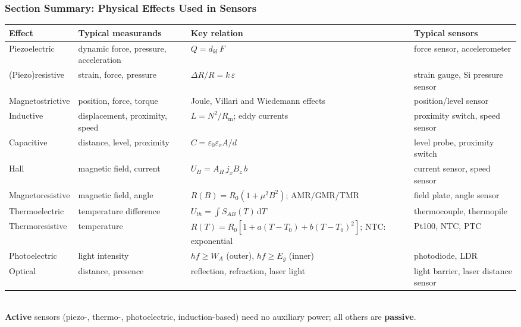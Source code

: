 \begin{frame}
	\frametitle{Section Summary: Physical Effects Used in Sensors}
	\scriptsize
	\setlength{\tabcolsep}{3pt}
	\begin{tabular}{@{}L{0.14\textwidth}L{0.22\textwidth}L{0.33\textwidth}L{0.27\textwidth}@{}}
		\toprule
		\textbf{Effect} & \textbf{Typical measurands} & \textbf{Key relation} & \textbf{Typical sensors}\\
		\midrule
		Piezoelectric & dynamic force, pressure, acceleration & $Q = d_{kl}\,F$ & force sensor, accelerometer\\
		(Piezo)resistive & strain, force, pressure & $\Delta R/R = k\,\varepsilon$ & strain gauge, Si pressure sensor\\
		Magnetostrictive & position, force, torque & Joule, Villari and Wiedemann effects & position/level sensor\\
		Inductive & displacement, proximity, speed & $L = N^2/R_\mathrm{m}$; eddy currents & proximity switch, speed sensor\\
		Capacitive & distance, level, proximity & $C = \varepsilon_0 \varepsilon_r A/d$ & level probe, proximity switch\\
		Hall & magnetic field, current & $U_H = A_H\, j_x B_z\, b$ & current sensor, speed sensor\\
		Magnetoresistive & magnetic field, angle & $R(B) = R_0(1 + \mu^2 B^2)$; AMR/GMR/TMR & field plate, angle sensor\\
		Thermoelectric & temperature difference & $U_{th} = \int S_{AB}(T)\,\mathrm{d}T$ & thermocouple, thermopile\\
		Thermoresistive & temperature & $R(T) = R_0[1 + a(T-T_0) + b(T-T_0)^2]$; NTC: exponential & Pt100, NTC, PTC\\
		Photoelectric & light intensity & $hf \geq W_A$ (outer), $hf \geq E_g$ (inner) & photodiode, LDR\\
		Optical & distance, presence & reflection, refraction, laser light & light barrier, laser distance sensor\\
		\bottomrule
	\end{tabular}\\[1mm]
	\footnotesize \textbf{Active} sensors (piezo-, thermo-, photoelectric, induction-based) need no auxiliary power; all others are \textbf{passive}.
\end{frame}
